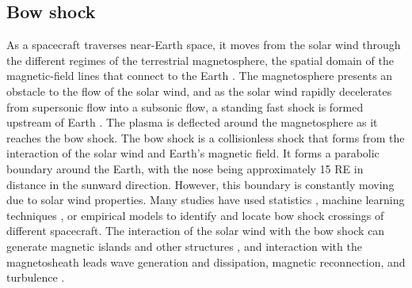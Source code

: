 \subsection{Bow shock}
As a spacecraft traverses near-Earth space, it moves from the solar wind through the different regimes of the terrestrial magnetosphere, the spatial domain of the magnetic-field lines that connect to the Earth \cite{Borovsky:2018}. The magnetosphere presents an obstacle to the flow of the solar wind, and as the solar wind rapidly decelerates from supersonic flow into a subsonic flow, a standing fast shock is formed upstream of Earth \citep{Dimmock:2013}. The plasma is deflected around the magnetosphere as it reaches the bow shock. The bow shock is a collisionless shock that forms from the interaction of the solar wind and Earth's magnetic field. It forms a parabolic boundary around the Earth, with the nose being approximately 15 \gls{RE} in distance in the sunward direction. However, this boundary is constantly moving due to solar wind properties. Many studies have used statistics \citep{Kruparova:2019}, machine learning techniques \citep{Lalti:2022}, or empirical models \citep{chapman_three-dimensional_2003} to identify and locate bow shock crossings of different spacecraft. The interaction of the solar wind with the bow shock can generate magnetic islands and other structures \citep{Karimabadi:2014}, and interaction with the magnetosheath leads wave generation and dissipation, magnetic reconnection, and turbulence \citep{Shaikh:2022}. %

